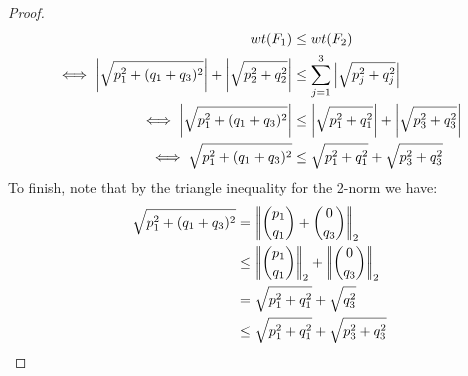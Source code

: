 \begin{proposition}
\begin{proof}
\begin{equation}
        \begin{aligned}
            wt(F_1) &\leq wt(F_2) \\
            \iff \left| \sqrt{p_1^2 + (q_1 + q_3)^2} \right| + \left| \sqrt{p_2^2 + q_2^2} \right| &\leq \sum_{j=1}^3 \left| \sqrt{p_j^2 + q_j^2} \right| \\
            \iff \left| \sqrt{p_1^2 + (q_1 + q_3)^2} \right| &\leq \left| \sqrt{p_1^2 + q_1^2} \right| + \left| \sqrt{p_3^2 + q_3^2} \right| \\
            \iff \sqrt{p_1^2 + (q_1 + q_3)^2} &\leq \sqrt{p_1^2 + q_1^2} + \sqrt{p_3^2 + q_3^2} \\
        \end{aligned}
        \end{equation}
        To finish, note that by the triangle inequality for the 2-norm we have:
        \begin{equation}
            \begin{aligned}
                \sqrt{p_1^2 + (q_1 + q_3)^2}
                &= \left| \! \left| \binom{p_1}{q_1} + \binom{0}{q_3} \right| \! \right|_2 \\
                &\leq \left| \! \left| \binom{p_1}{q_1} \right| \! \right|_2 + \left| \! \left| \binom{0}{q_3} \right| \! \right|_2 \\
                &= \sqrt{p_1^2 + q_1^2} + \sqrt{q_3^2} \\
                &\leq \sqrt{p_1^2 + q_1^2} + \sqrt{p_3^2 + q_3^2} \\
            \end{aligned}
        \end{equation}
    \end{proof}
    \end{proposition}

